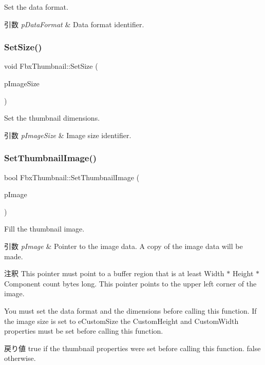 Set the data format. 
\begin{DoxyParams}{引数}
{\em p\+Data\+Format} & Data format identifier. \\
\hline
\end{DoxyParams}
\mbox{\label{class_fbx_thumbnail_a9e4c845718d00e6d133806d13e332059}} 
\subsubsection{\texorpdfstring{Set\+Size()}{SetSize()}}
{\footnotesize\ttfamily void Fbx\+Thumbnail\+::\+Set\+Size (\begin{DoxyParamCaption}\item[{\hyperlink{class_fbx_thumbnail_a3d57568544f878eadd9889770443c234}{E\+Image\+Size}}]{p\+Image\+Size }\end{DoxyParamCaption})}

Set the thumbnail dimensions. 
\begin{DoxyParams}{引数}
{\em p\+Image\+Size} & Image size identifier. \\
\hline
\end{DoxyParams}
\mbox{\label{class_fbx_thumbnail_a44c5615f4a4428a158787f3cd4e02997}} 
\subsubsection{\texorpdfstring{Set\+Thumbnail\+Image()}{SetThumbnailImage()}}
{\footnotesize\ttfamily bool Fbx\+Thumbnail\+::\+Set\+Thumbnail\+Image (\begin{DoxyParamCaption}\item[{const \hyperlink{fbxtypes_8h_a1be3cadf61e76f49142eb83e66ffe8bd}{Fbx\+U\+Char} $\ast$}]{p\+Image }\end{DoxyParamCaption})}

Fill the thumbnail image. 
\begin{DoxyParams}{引数}
{\em p\+Image} & Pointer to the image data. A copy of the image data will be made. \\
\hline
\end{DoxyParams}
\begin{DoxyRemark}{注釈}
This pointer must point to a buffer region that is at least Width $\ast$ Height $\ast$ Component count bytes long. This pointer points to the upper left corner of the image. 

You must set the data format and the dimensions before calling this function. If the image size is set to e\+Custom\+Size the Custom\+Height and Custom\+Width properties must be set before calling this function. 
\end{DoxyRemark}
\begin{DoxyReturn}{戻り値}
{\ttfamily true} if the thumbnail properties were set before calling this function. {\ttfamily false} otherwise. 
\end{DoxyReturn}


